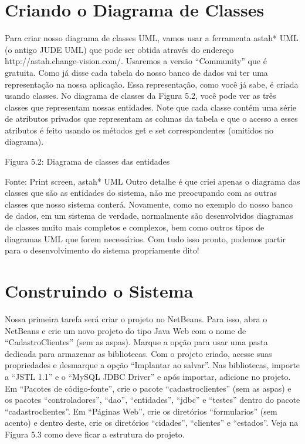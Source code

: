 \section{Criando o Diagrama de Classes}

Para criar nosso diagrama de classes UML, vamos usar a ferramenta astah* UML (o antigo JUDE UML) que pode ser obtida através do endereço http://astah.change-vision.com/. Usaremos a versão “Community” que é gratuita. Como já disse cada tabela do nosso banco de dados vai ter uma representação na nossa aplicação. Essa representação, como você já sabe, é criada usando classes. No diagrama de classes da Figura 5.2, você pode ver as três classes que representam nossas entidades. Note que cada classe contém uma série de atributos privados que representam as colunas da tabela e que o acesso a esses atributos é feito usando os métodos get e set correspondentes (omitidos no diagrama). 




Figura 5.2: Diagrama de classes das entidades
 
Fonte: Print screen, astah* UML
Outro detalhe é que criei apenas o diagrama das classes que são as entidades do sistema, não me preocupando com as outras classes que nosso sistema conterá. Novamente, como no exemplo do nosso banco de dados, em um sistema de verdade, normalmente são desenvolvidos diagramas de classes muito mais completos e complexos, bem como outros tipos de diagramas UML que forem necessários. Com tudo isso pronto, podemos partir para o desenvolvimento do sistema propriamente dito!



\section{Construindo o Sistema}

Nossa primeira tarefa será criar o projeto no NetBeans. Para isso, abra o NetBeans e crie um novo projeto do tipo Java Web com o nome de “CadastroClientes” (sem as aspas). Marque a opção para usar uma pasta dedicada para armazenar as bibliotecas. Com o projeto criado, acesse suas propriedades e desmarque a opção “Implantar ao salvar”. Nas bibliotecas, importe a “JSTL 1.1” e o “MySQL JDBC Driver” e após importar, adicione no projeto.
Em “Pacotes de código-fonte”, crie o pacote “cadastroclientes” (sem as aspas) e os pacotes “controladores”, “dao”, “entidades”, “jdbc” e “testes” dentro do pacote “cadastroclientes”. Em “Páginas Web”, crie os diretórios “formularios” (sem acento) e dentro deste, crie os diretórios “cidades”, “clientes” e “estados”. Veja na Figura 5.3 como deve ficar a estrutura do projeto.






